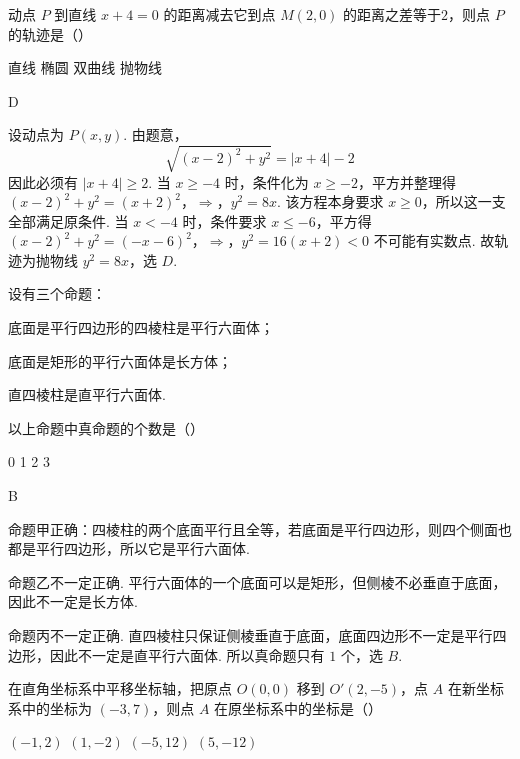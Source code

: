 \begin{problem}
动点 \(P\) 到直线 \(x + 4 = 0\) 的距离减去它到点 \(M(2,0)\) 的距离之差等于\(2\)，则点 \(P\) 的轨迹是（\quad）

\choices
    {直线}
    {椭圆}
    {双曲线}
    {抛物线}
\end{problem}

\begin{answer}
D
\end{answer}

\begin{solution}
设动点为 \(P(x,y)\). 由题意，
\[
\sqrt{(x-2)^2+y^2}=|x+4|-2
\]
因此必须有 \(|x+4|\geqslant 2\). 当 \(x\geqslant-4\) 时，条件化为 \(x\geqslant-2\)，平方并整理得
\((x-2)^2+y^2=(x+2)^2\)，\(\Longrightarrow\)，\(y^2=8x\).
该方程本身要求 \(x\geqslant0\)，所以这一支全部满足原条件. 当 \(x<-4\) 时，条件要求 \(x\leqslant-6\)，平方得
\((x-2)^2+y^2=(-x-6)^2\)，\(\Longrightarrow\)，\(y^2=16(x+2)<0\)
不可能有实数点. 故轨迹为抛物线 \(y^2=8x\)，选 \(D\).
\end{solution}

\begin{problem}
设有三个命题：

\begin{circlelist}
\item 底面是平行四边形的四棱柱是平行六面体；
\item 底面是矩形的平行六面体是长方体；
\item 直四棱柱是直平行六面体.
\end{circlelist}

以上命题中真命题的个数是（\quad）

\choices
    {0}
    {1}
    {2}
    {3}
\end{problem}

\begin{answer}
B
\end{answer}

\begin{solution}
命题甲正确：四棱柱的两个底面平行且全等，若底面是平行四边形，则四个侧面也都是平行四边形，所以它是平行六面体.

命题乙不一定正确. 平行六面体的一个底面可以是矩形，但侧棱不必垂直于底面，因此不一定是长方体.

命题丙不一定正确. 直四棱柱只保证侧棱垂直于底面，底面四边形不一定是平行四边形，因此不一定是直平行六面体. 所以真命题只有 \(1\) 个，选 \(B\).
\end{solution}

\begin{problem}
在直角坐标系中平移坐标轴，把原点 \(O(0,0)\) 移到 \(O'(2,-5)\)，点 \(A\) 在新坐标系中的坐标为 \((-3,7)\)，则点 \(A\) 在原坐标系中的坐标是（\quad）

\choices
    {\((-1,2)\)}
    {\((1,-2)\)}
    {\((-5,12)\)}
    {\((5,-12)\)}
\end{problem}

